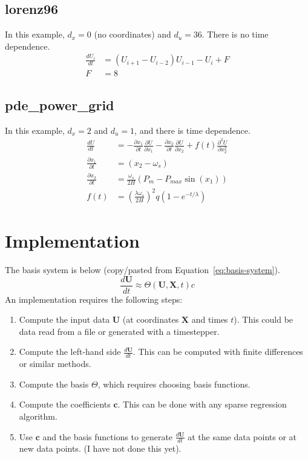 \documentclass{article}
\let\vec\mathbf
\begin{document}
\subsection{lorenz96}
In this example, $d_x = 0$ (no coordinates) and $d_u = 36$. There is no time dependence.
\begin{align*}
\frac{dU_i}{dt} &= (U_{i+1} - U_{i-2}) U_{i-1} - U_i + F \\
F &= 8
\end{align*}

\subsection{pde\_power\_grid}
In this example, $d_x = 2$ and $d_u = 1$, and there is time dependence.
\begin{align*}
\frac{dU}{dt} &= - \frac{\partial x_1}{\partial t} \frac{\partial U}{\partial x_1}
                 - \frac{\partial x_2}{\partial t} \frac{\partial U}{\partial x_2}
                 + f(t) \frac{\partial^2 U}{\partial x_2^2}
\\ \frac{\partial x_1}{\partial t} &= (x_2 - \omega_s)
\\ \frac{\partial x_2}{\partial t} &= \frac{\omega_s}{2H}(P_m - P_{max}\sin(x_1))
\\ f(t) &= \left(\frac{\lambda \omega_s}{2H}\right) ^ 2 q (1-e^{-t/\lambda})
\end{align*}

\section{Implementation}

The basis system is below (copy/pasted from Equation~\ref{eq:basis-system}).
\begin{equation}
\frac{d\vec{U}}{dt} \approx \Theta(\vec{U}, \vec{X}, t) c
\end{equation}
An implementation requires the following steps:
\begin{enumerate}
    \item Compute the input data $\vec{U}$ (at coordinates $\vec{X}$ and times $t$). This could be data read from a file or generated with a timestepper.
    \item Compute the left-hand side $\frac{d\vec{U}}{dt}$. This can be computed with finite differences or similar methods.
    \item Compute the basis $\Theta$, which requires choosing basis functions.
    \item Compute the coefficients $\vec{c}$. This can be done with any sparse regression algorithm.
    \item Use $\vec{c}$ and the basis functions to generate $\frac{d\vec{U}}{dt}$ at the same data points or at new data points. (I have not done this yet).
\end{enumerate}
\end{document}
